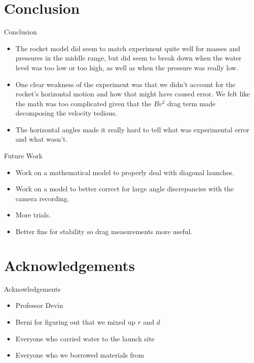 \documentclass[pdf]{beamer}
\begin{document}
\section{Conclusion}

\begin{frame}{Conclusion}
    \begin{itemize}
        \item The rocket model did seem to match experiment quite well for masses and pressures in the middle range, but did seem to break down when the water level was too low or too high, as well as when the pressure was really low.
        \item One clear weakness of the experiment was that we didn't account for the rocket's horizontal motion and how that might have caused error. We felt like the math was too complicated given that the $Bv^2$ drag term made decomposing the velocity tedious.
        \item The horizontal angles made it really hard to tell what was experimental error and what wasn't.
    \end{itemize}
\end{frame}

\begin{frame}{Future Work}
    \begin{itemize}
        \item Work on a mathematical model to properly deal with diagonal launches.
        \item Work on a model to better correct for large angle discrepancies with the camera recording.
        \item More trials.
        \item Better fins for stability so drag measurements more useful.
    \end{itemize}
\end{frame}


\section{Acknowledgements}

\begin{frame}{Acknowledgements}
\begin{itemize}
\item Professor Devin 
\item Berni for figuring out that we mixed up $r$ and $d$
\item Everyone who carried water to the launch site
\item Everyone who we borrowed materials from
\end{itemize}
\end{frame}
\end{document}
